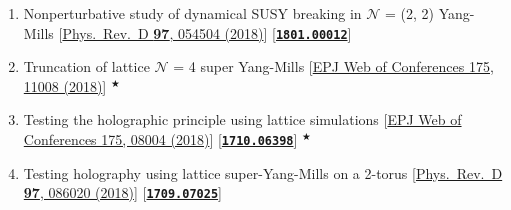 \begin{enumerate}
 \item Nonperturbative study of dynamical SUSY breaking in $\mathcal{N}$ = (2, 2) Yang-Mills [\href{https://journals.aps.org/prd/abstract/10.1103/PhysRevD.97.054504}{Phys.\ Rev.\ D {\bf 97}, 054504 (2018)}] [\texttt{\textbf{\textcolor{blue}{\href{https://arxiv.org/abs/1801.00012}{1801.00012}}}}]  
 \item Truncation of lattice $\mathcal{N}$ = 4 super Yang-Mills [\href{https://doi.org/10.1051/epjconf/201817511008}{EPJ Web of Conferences 175, 11008 (2018)}] $^{\bigstar}$
\item Testing the holographic principle using lattice simulations  [\href{https://doi.org/10.1051/epjconf/201817508004}{EPJ Web of Conferences 175, 08004 (2018)}] [\texttt{\textbf{\textcolor{blue}{\href{https://arxiv.org/abs/1710.06398}{1710.06398}}}}] $^{\bigstar}$
\item Testing holography using lattice super-Yang-Mills on a 2-torus [\href{https://journals.aps.org/prd/abstract/10.1103/PhysRevD.97.086020}{Phys.\ Rev.\ D {\bf 97}, 086020 (2018)}] [\texttt{\textbf{\textcolor{blue}{\href{https://arxiv.org/abs/1709.07025}{1709.07025}}}}]
\end{enumerate}
